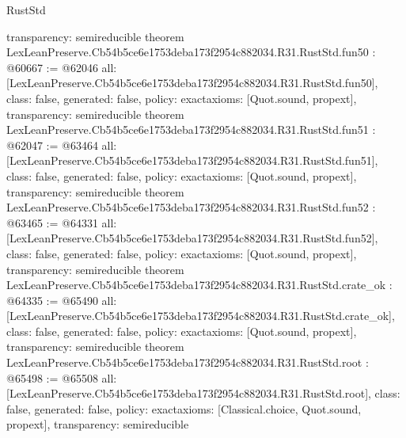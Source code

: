 \begin{lexlean}{RustStd}
\begin{coremodule}
{  transparency: semireducible
}
theorem LexLeanPreserve.Cb54b5ce6e1753deba173f2954c882034.R31.RustStd.fun50 : @60667 := @62046 {
  all: [LexLeanPreserve.Cb54b5ce6e1753deba173f2954c882034.R31.RustStd.fun50],
  class: false,
  generated: false,
  policy: exact{axioms: [Quot.sound, propext]},
  transparency: semireducible
}
theorem LexLeanPreserve.Cb54b5ce6e1753deba173f2954c882034.R31.RustStd.fun51 : @62047 := @63464 {
  all: [LexLeanPreserve.Cb54b5ce6e1753deba173f2954c882034.R31.RustStd.fun51],
  class: false,
  generated: false,
  policy: exact{axioms: [Quot.sound, propext]},
  transparency: semireducible
}
theorem LexLeanPreserve.Cb54b5ce6e1753deba173f2954c882034.R31.RustStd.fun52 : @63465 := @64331 {
  all: [LexLeanPreserve.Cb54b5ce6e1753deba173f2954c882034.R31.RustStd.fun52],
  class: false,
  generated: false,
  policy: exact{axioms: [Quot.sound, propext]},
  transparency: semireducible
}
theorem LexLeanPreserve.Cb54b5ce6e1753deba173f2954c882034.R31.RustStd.crate_ok : @64335 := @65490 {
  all: [LexLeanPreserve.Cb54b5ce6e1753deba173f2954c882034.R31.RustStd.crate_ok],
  class: false,
  generated: false,
  policy: exact{axioms: [Quot.sound, propext]},
  transparency: semireducible
}
theorem LexLeanPreserve.Cb54b5ce6e1753deba173f2954c882034.R31.RustStd.root : @65498 := @65508 {
  all: [LexLeanPreserve.Cb54b5ce6e1753deba173f2954c882034.R31.RustStd.root],
  class: false,
  generated: false,
  policy: exact{axioms: [Classical.choice, Quot.sound, propext]},
  transparency: semireducible
}


\end{coremodule}
\end{lexlean}
